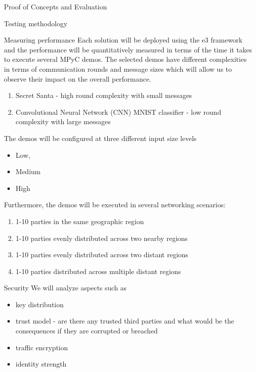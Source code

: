 \begin{frame}{Proof of Concepts and Evaluation}
\begin{block}{Testing methodology}
\begin{block}{Measuring performance}
Each solution will be deployed using the \gls{e3} framework and the
performance will be quantitatively measured in terms of the time it
takes to execute several MPyC demos. The selected demos have different
complexities in terms of communication rounds and message sizes which
will allow us to observe their impact on the overall performance.

\begin{enumerate}
\tightlist
\item
  Secret Santa - high round complexity with small messages
\item
  Convolutional Neural Network (CNN) MNIST classifier - low round
  complexity with large messages
\end{enumerate}

The demos will be configured at three different input size levels

\begin{itemize}
\tightlist
\item
  Low,
\item
  Medium
\item
  High
\end{itemize}

Furthermore, the demos will be executed in several networking scenarios:

\begin{enumerate}
\tightlist
\item
  1-10 parties in the same geographic region
\item
  1-10 parties evenly distributed across two nearby regions
\item
  1-10 parties evenly distributed across two distant regions
\item
  1-10 parties distributed across multiple distant regions
\end{enumerate}
\end{block}

\begin{block}{Security}
\protect\hypertarget{security}{}
We will analyze aspects such as

\begin{itemize}
\tightlist
\item
  key distribution
\item
  trust model - are there any trusted third parties and what would be
  the consequences if they are corrupted or breached
\item
  traffic encryption
\item
  identity strength
\end{itemize}
\end{block}


\end{block}
\end{frame}
